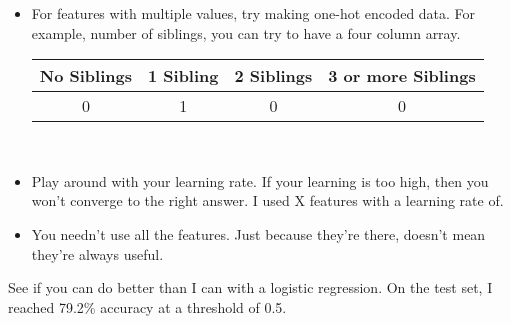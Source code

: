\documentclass[paper=a4, fontsize=11pt]{scrartcl} %
\begin{document}
\begin{itemize}
    \item For features with multiple values, try making one-hot encoded data. For example, number of siblings, you can try to have a four column array. \\
    
    \begin{tabular}{|c|c|c|c|}
        \hline
         No Siblings & 1 Sibling & 2 Siblings & 3 or more Siblings  \\
         \hline
                0    &    1      &      0     &       0 \\
        \hline
    \end{tabular} \\
    \item Play around with your learning rate. If your learning is too high, then you won't converge to the right answer. I used X features with a learning rate of.  \item You needn't use all the features. Just because they're there, doesn't mean they're always useful.
\end{itemize}

See if you can do better than I can with a logistic regression. On the test set, I reached 79.2\% accuracy at a threshold of 0.5.
\end{document}
